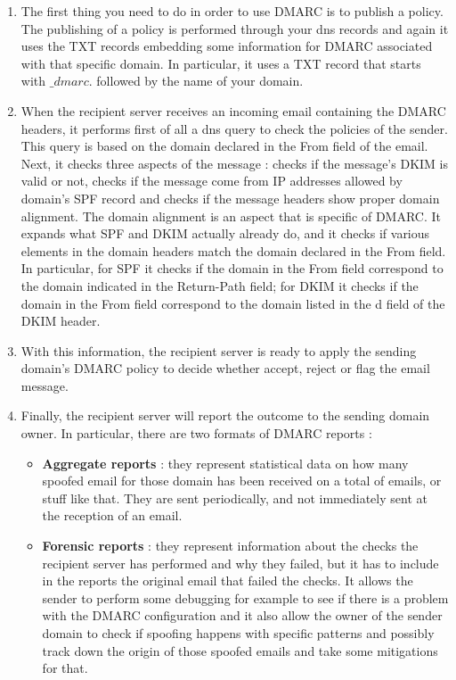 \begin{enumerate}
\item The first thing you need to do in order to use DMARC is to publish a policy. The publishing of a policy is performed through your dns records and again it uses the TXT records embedding some information for DMARC associated with that specific domain. In particular, it uses a TXT record that starts with $\_dmarc.$ followed by the name of your domain.
\item When the recipient server receives an incoming email containing the DMARC headers, it performs first of all a dns query to check the policies of the sender. This query is based on the domain declared in the From field of the email. Next, it checks three aspects of the message : checks if the message's DKIM is valid or not, checks if the message come from IP addresses allowed by domain's SPF record and checks if the message headers show proper domain alignment. The domain alignment is an aspect that is specific of DMARC. It expands what SPF and DKIM actually already do, and it checks if various elements in the domain headers match the domain declared in the From field. In particular, for SPF it checks if the domain in the From field correspond to the domain indicated in the Return-Path field; for DKIM it checks if the domain in the From field correspond to the domain listed in the d field of the DKIM header.
\item With this information, the recipient server is ready to apply the sending domain's DMARC policy to decide whether accept, reject or flag the email message.
\item Finally, the recipient server will report the outcome to the sending domain owner. In particular, there are two formats of DMARC reports :
\begin{itemize}
\item \textbf{Aggregate reports} : they represent statistical data on how many spoofed email for those domain has been received on a total of emails, or stuff like that. They are sent periodically, and not immediately sent at the reception of an email.
\item \textbf{Forensic reports} : they represent information about the checks the recipient server has performed and why they failed, but it has to include in the reports the original email that failed the checks. It allows the sender to perform some debugging for example to see if there is a problem with the DMARC configuration  and it also allow the owner of the sender domain to check if spoofing happens with specific patterns and possibly track down the origin of those spoofed emails and take some mitigations for that.
\end{itemize}
\end{enumerate}
